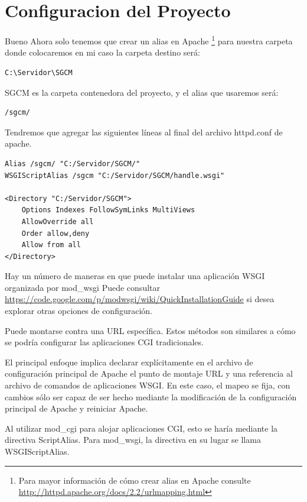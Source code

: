 \section{Configuracion del Proyecto}

Bueno Ahora solo tenemos que crear un alias en Apache \footnote{Para mayor información de cómo crear alias en Apache consulte \url{http://httpd.apache.org/docs/2.2/urlmapping.html}} para nuestra carpeta donde colocaremos en mi caso la carpeta destino será:

\begin{lstlisting}[style=consola]
	C:\Servidor\SGCM
\end{lstlisting}
\vspace{0.1cm}

SGCM es la carpeta contenedora del proyecto, y el alias que usaremos será:

\begin{lstlisting}[style=consola]
	/sgcm/ 
\end{lstlisting}
\vspace{0.1cm}

Tendremos que agregar las siguientes líneas al final del archivo httpd.conf de apache.

\begin{lstlisting}[style=HTML]
Alias /sgcm/ "C:/Servidor/SGCM/" 
WSGIScriptAlias /sgcm "C:/Servidor/SGCM/handle.wsgi" 

<Directory "C:/Servidor/SGCM">
    Options Indexes FollowSymLinks MultiViews
    AllowOverride all
    Order allow,deny
    Allow from all
</Directory>
\end{lstlisting}
\vspace{0.1cm}


Hay un número de maneras en que puede instalar una aplicación WSGI organizada por mod\_wsgi
Puede consultar \url{https://code.google.com/p/modwsgi/wiki/QuickInstallationGuide} si desea explorar otras opciones de configuración.

Puede montarse contra una URL específica. Estos métodos son similares a cómo se podría configurar las aplicaciones CGI tradicionales.

El principal enfoque implica declarar explícitamente en el archivo de configuración principal de Apache el punto de montaje URL y una referencia al archivo de comandos de aplicaciones WSGI. En este caso, el mapeo se fija, con cambios sólo ser capaz de ser hecho mediante la modificación de la configuración principal de Apache y reiniciar Apache.

Al utilizar mod\_cgi para alojar aplicaciones CGI, esto se haría mediante la directiva ScriptAlias. Para mod\_wsgi, la directiva en su lugar se llama WSGIScriptAlias.

